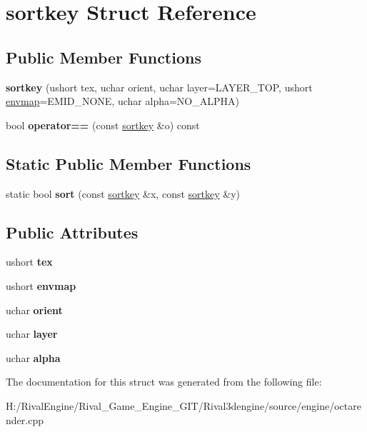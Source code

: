 \hypertarget{structsortkey}{}\section{sortkey Struct Reference}
\label{structsortkey}
\subsection*{Public Member Functions}
\begin{DoxyCompactItemize}
\item 
\mbox{\label{structsortkey_a7bb131e4c3c44f27da815eb96f5522fd}} 
{\bfseries sortkey} (ushort tex, uchar orient, uchar layer=L\+A\+Y\+E\+R\+\_\+\+T\+OP, ushort \hyperlink{structenvmap}{envmap}=E\+M\+I\+D\+\_\+\+N\+O\+NE, uchar alpha=N\+O\+\_\+\+A\+L\+P\+HA)
\item 
\mbox{\label{structsortkey_a293993b2004b873c0b201333d6bc5a8c}} 
bool {\bfseries operator==} (const \hyperlink{structsortkey}{sortkey} \&o) const
\end{DoxyCompactItemize}
\subsection*{Static Public Member Functions}
\begin{DoxyCompactItemize}
\item 
\mbox{\label{structsortkey_a9e33024781333430cfed65eb61225ee3}} 
static bool {\bfseries sort} (const \hyperlink{structsortkey}{sortkey} \&x, const \hyperlink{structsortkey}{sortkey} \&y)
\end{DoxyCompactItemize}
\subsection*{Public Attributes}
\begin{DoxyCompactItemize}
\item 
\mbox{\label{structsortkey_ae35601fb49e4f7b1ea8015b6011f08b1}} 
ushort {\bfseries tex}
\item 
\mbox{\label{structsortkey_a0a3a40a6cfbfc9c86355d946d73b6315}} 
ushort {\bfseries envmap}
\item 
\mbox{\label{structsortkey_a4c2e07c3566cad1b7000e984f05f95db}} 
uchar {\bfseries orient}
\item 
\mbox{\label{structsortkey_a6dfd5b50c387f0b44de16a2a828abe72}} 
uchar {\bfseries layer}
\item 
\mbox{\label{structsortkey_ab074d2ba52006093a6231e57221bb9cc}} 
uchar {\bfseries alpha}
\end{DoxyCompactItemize}


The documentation for this struct was generated from the following file\+:\begin{DoxyCompactItemize}
\item 
H\+:/\+Rival\+Engine/\+Rival\+\_\+\+Game\+\_\+\+Engine\+\_\+\+G\+I\+T/\+Rival3dengine/source/engine/octarender.\+cpp\end{DoxyCompactItemize}
